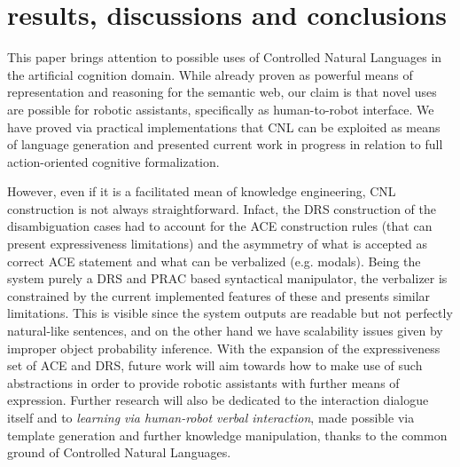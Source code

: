 \documentclass[oribibl]{llncs}
\begin{document}
\section{results, discussions and conclusions}
This paper brings attention to possible uses of Controlled Natural Languages in the artificial cognition domain. While already proven as powerful means of representation and reasoning for the semantic web\cite{kuhnkaljurandsemantic}, our claim is that novel uses are possible for robotic assistants, specifically as human-to-robot interface.
We have proved via practical implementations that CNL can be exploited as means of language generation and presented current work in progress in relation to full action-oriented cognitive formalization.

However, even if it is a facilitated mean of knowledge engineering, CNL construction is not always straightforward\cite{Schwitter05alayered}. Infact, the DRS construction of the disambiguation cases had to account for the ACE construction rules (that can present expressiveness limitations) and the asymmetry of what is accepted as correct ACE statement and what can be verbalized (e.g. modals). Being the system purely a DRS\cite{drslatest} and PRAC based syntactical manipulator, the verbalizer is constrained by the current implemented features of these and presents similar limitations. This is visible since the system outputs are readable but not perfectly natural-like sentences, and on the other hand we have scalability issues given by improper object probability inference.
With the expansion of the expressiveness set of ACE and DRS, future work will aim towards how to make use of such abstractions in order to provide robotic assistants with further means of expression.
Further research will also be dedicated to the interaction dialogue itself and to \textit{learning via human-robot verbal interaction}, made possible via template generation and further knowledge manipulation, thanks to the common ground of Controlled Natural Languages.

%
{}

%
\end{document}
